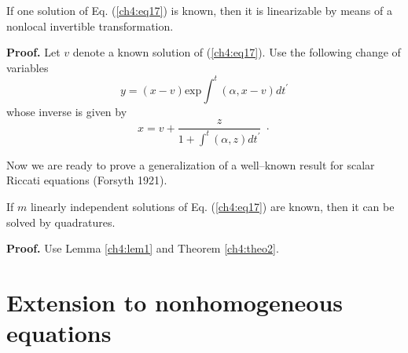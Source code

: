 {\begin{lem}[Anderson {\em et al.} 1982]
\label{ch4:lem1}
\begin{em}
If one solution of Eq. (\ref{ch4:eq17}) is known, then it 
is linearizable by means of a nonlocal invertible transformation.
\end{em}
\end{lem}
{\bf Proof.} Let $v$ denote a known solution of (\ref{ch4:eq17}).
Use the following change of variables
\[y=(x-v)\mbox{exp}\int^t (\alpha,x-v)dt^{'}\]
whose inverse is given by
\[x=v+\frac{z}{1+\int^t (\alpha,z)dt^{'}}\;\cdot\]

Now we are ready to prove a generalization of a well--known result for
scalar Riccati equations (Forsyth 1921).
\begin{theo}
\begin{em}
If $m$ linearly independent solutions of Eq. (\ref{ch4:eq17}) are known,
then it can be solved by quadratures.
\end{em}
\end{theo}
{\bf Proof.} Use Lemma \ref{ch4:lem1} and Theorem \ref{ch4:theo2}.

\section{Extension to nonhomogeneous equations}

}
